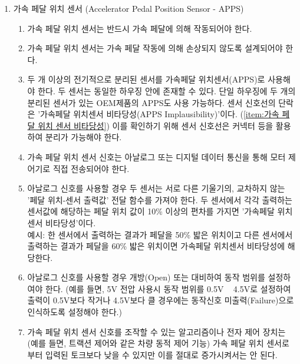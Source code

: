 \documentclass[final,a4paper,10pt]{report}
\begin{document}
\begin{enumerate}
  \item\label{rule:formula-technical.components.apps} 가속 페달 위치 센서 (Accelerator Pedal Position Sensor - APPS)
    \begin{enumerate}
      \item\label{rule:formula-technical.components.apps.actuated-by-pedal} 가속 페달 위치 센서는 반드시 가속 페달에 의해 작동되어야 한다.
      \item\label{rule:formula-technical.components.apps.damage-resistant-design} 가속 페달 위치 센서는 가속 페달 작동에 의해 손상되지 않도록 설계되어야 한다.
      \item\label{rule:formula-technical.components.apps.dual-sensor-separable-wiring} {\color{blue}두 개 이상의 전기적으로 분리된 센서를 가속페달 위치센서(APPS)로 사용해야 한다. 두 센서는 동일한 하우징 안에 존재할 수 있다. 단일 하우징에 두 개의 분리된 센서가 있는 OEM제품의 APPS도 사용 가능하다. 센서 신호선의 단락은 '가속페달 위치센서 비타당성(APPS Implausibility)'이다. (\ref{item:가속 페달 위치 센서 비타당성}) 이를 확인하기 위해 센서 신호선은 커넥터 등을 활용하여 분리가 가능해야 한다.}
      \item\label{rule:formula-technical.components.apps.direct-signal-to-controller} 가속 페달 위치 센서 신호는 아날로그 또는 디지털 데이터 통신을 통해 모터 제어기로 직접 전송되어야 한다.
      \item\label{rule:formula-technical.components.apps.deviation-10pct-implausibility} {\color{blue}아날로그 신호를 사용할 경우 두 센서는 서로 다른 기울기의, 교차하지 않는 '페달 위치-센서 출력값' 전달 함수를 가져야 한다. 두 센서에서 각각 출력하는 센서값에 해당하는 페달 위치 값이 10\% 이상의 편차를 가지면 '가속페달 위치센서 비타당성'이다. \\
        예시: 한 센서에서 출력하는 결과가 페달을 50\% 밟은 위치이고 다른 센서에서 출력하는 결과가 페달을 60\% 밟은 위치이면 가속페달 위치센서 비타당성에 해당한다.}
      \item\label{rule:formula-technical.components.apps.open-short-fault-range} 아날로그 신호를 사용할 경우 개방(Open) 또는 대비하여 동작 범위를 설정하여야 한다. (예를 들면, 5V 전압 사용시 동작 범위를 0.5V \string~ 4.5V로 설정하여 출력이 0.5V보다 작거나 4.5V보다 클 경우에는 동작신호 미출력(Failure)으로 인식하도록 설정해야 한다.)
      \item\label{rule:formula-technical.components.apps.torque-reduce-only} 가속 페달 위치 센서 신호를 조작할 수 있는 알고리즘이나 전자 제어 장치는 (예를 들면, 트랙션 제어와 같은 차량 동적 제어 기능) 가속 페달 위치 센서로부터 입력된 토크보다 낮을 수 있지만 이를 절대로 증가시켜서는 안 된다.
    \end{enumerate}


\end{enumerate}
\end{document}
